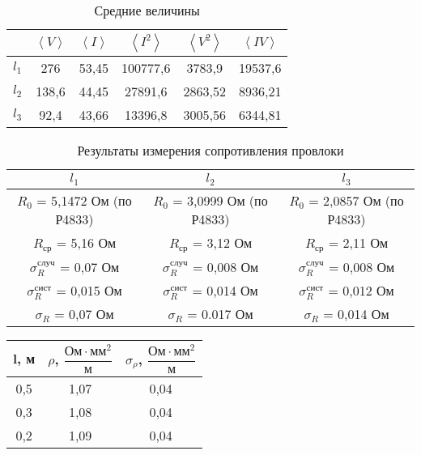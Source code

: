 \documentclass[a4paper, 10pt]{article}%
\begin{document}
\newpage
\begin{table}
\caption{Средние величины}
\begin{tabular}{|r|c|c|c|c|c|}
\hline
&$\left\langle V \right\rangle$ & $\left\langle I \right\rangle$ & $\left\langle I^2 \right\rangle$ & $\left\langle  V^2 \right\rangle$  & $\left\langle IV \right\rangle$ \\
\hline
$l_1$&276&53,45&100777,6&3783,9&19537,6 \\
\hline
$l_2$&138,6&44,45&27891,6&2863,52&8936,21 \\
\hline
$l_3$&92,4&43,66&13396,8&3005,56&6344,81 \\
\hline
\end{tabular}
\end{table}
\begin{table}
\caption{Результаты измерения сопротивления провлоки}
\begin{tabular}{|c|c|c|}
\hline
$l_1$&$l_2$&$l_3$ \\
\hline
$R_0$ = 5,1472 Ом (по Р4833) & $R_0$ = 3,0999 Ом (по Р4833) & $R_0$ = 2,0857 Ом (по Р4833) \\
$R_\text{ср}$ = 5,16 Ом  & $R_\text{ср}$ = 3,12 Ом  & $R_\text{ср}$ = 2,11 Ом  \\
$\sigma^{\text{случ}}_{R}$ = 0,07 Ом&$\sigma^{\text{случ}}_{R}$ = 0,008 Ом&  $\sigma^{\text{случ}}_{R}$ = 0,008 Ом \\
$\sigma^{\text{сист}}_{R}$ = 0,015 Ом&$\sigma^{\text{сист}}_{R}$ = 0,014 Ом&  $\sigma^{\text{сист}}_{R}$ = 0,012 Ом \\
$\sigma_{R}$ = 0,07 Ом&$\sigma_{R}$ =  0.017 Ом&$\sigma_{R}$ =   0,014 Ом \\
\hline
\end{tabular}
\end{table}
\begin{table}
\begin{tabular}{|c|c|c|}
\hline
l, м& $\rho$, $\dfrac{\text{Ом} \cdot \text{мм}^2}{\text{м}}$& $\sigma_{\rho}$, $\dfrac{\text{Ом} \cdot \text{мм}^2}{\text{м}}$ \\
\hline
0,5&1,07&0,04 \\
0,3&1,08&0,04 \\
0,2&1,09&0,04 \\
\hline
\end{tabular}
\end{table}
\end{document}
